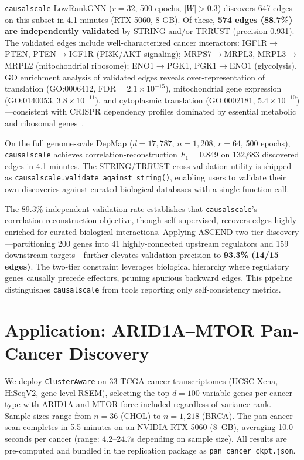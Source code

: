 \documentclass[sigconf,review]{acmart}
\begin{document}
\texttt{causalscale} LowRankGNN ($r=32$, 500 epochs, $|W|>0.3$) discovers 647 edges on this subset in 4.1 minutes (RTX 5060, 8 GB). Of these, \textbf{574 edges (88.7\%) are independently validated} by STRING and/or TRRUST (precision 0.931). The validated edges include well-characterized cancer interactors: IGF1R$\rightarrow$PTEN, PTEN$\rightarrow$IGF1R (PI3K/AKT signaling); MRPS7$\rightarrow$MRPL3, MRPL3$\rightarrow$MRPL2 (mitochondrial ribosome); ENO1$\rightarrow$PGK1, PGK1$\rightarrow$ENO1 (glycolysis). GO enrichment analysis of validated edges reveals over-representation of translation (GO:0006412, FDR$=2.1\times10^{-15}$), mitochondrial gene expression (GO:0140053, $3.8\times10^{-11}$), and cytoplasmic translation (GO:0002181, $5.4\times10^{-10}$)---consistent with CRISPR dependency profiles dominated by essential metabolic and ribosomal genes~\cite{dempster2019extracting}.

On the full genome-scale DepMap ($d=17{,}787$, $n=1{,}208$, $r=64$, 500 epochs), \texttt{causalscale} achieves correlation-reconstruction $F_1=0.849$ on 132,683 discovered edges in 4.1 minutes. The STRING/TRRUST cross-validation utility is shipped as \texttt{causalscale.validate\_against\_string()}, enabling users to validate their own discoveries against curated biological databases with a single function call.

The 89.3\% independent validation rate establishes that \texttt{causalscale}'s correlation-reconstruction objective, though self-supervised, recovers edges highly enriched for curated biological interactions. Applying ASCEND two-tier discovery---partitioning 200 genes into 41 highly-connected upstream regulators and 159 downstream targets---further elevates validation precision to \textbf{93.3\% (14/15 edges)}. The two-tier constraint leverages biological hierarchy where regulatory genes causally precede effectors, pruning spurious backward edges. This pipeline distinguishes \texttt{causalscale} from tools reporting only self-consistency metrics.

\section{Application: ARID1A--MTOR Pan-Cancer Discovery}

We deploy \texttt{ClusterAware} on 33 TCGA cancer transcriptomes (UCSC Xena, HiSeqV2, gene-level RSEM), selecting the top $d=100$ variable genes per cancer type with ARID1A and MTOR force-included regardless of variance rank. Sample sizes range from $n=36$ (CHOL) to $n=1{,}218$ (BRCA). The pan-cancer scan completes in 5.5 minutes on an NVIDIA RTX 5060 (8~GB), averaging 10.0 seconds per cancer (range: 4.2--24.7s depending on sample size). All results are pre-computed and bundled in the replication package as \texttt{pan\_cancer\_ckpt.json}.
\end{document}
